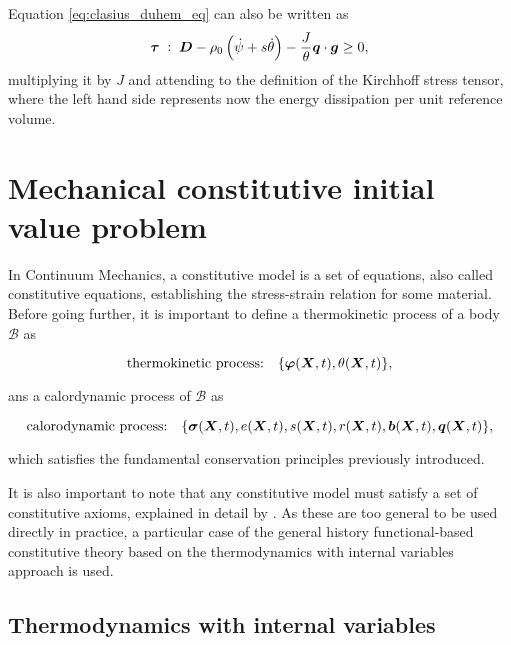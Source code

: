 Equation \eqref{eq:clasius_duhem_eq} can also be written as
\begin{equation}
    \bm{\tau}\;:\;\bm{D} -\rho_0\left(\dot\psi + s\dot \theta\right) -\frac{J}{\theta}\bm{q}\cdot \bm{g} \geq 0,
\end{equation}
multiplying it by $J$ and attending to the definition of the Kirchhoff stress tensor, where the left hand side represents now the energy dissipation per unit reference volume.


\section{Mechanical constitutive initial value problem}

In Continuum Mechanics, a constitutive model is a set of equations, also called constitutive equations, establishing the stress-strain relation for some material.
Before going further, it is important to define a thermokinetic process of a body $\mathscr{B}$ as
\begin{highlight}
    \begin{equation}
        \text{thermokinetic process:}\quad\{\bm{\varphi}(\bm{X}, t), \theta(\bm{X}, t)\},
    \end{equation}
\end{highlight}
ans a calordynamic process of $\mathscr{B}$ as
\begin{highlight}
    \begin{equation}
        \text{calorodynamic process:}\quad \{\bm{\sigma}(\bm{X}, t), e(\bm{X}, t), s(\bm{X}, t), r(\bm{X}, t), \bm{b}(\bm{X},t), \bm{q}(\bm{X}, t)\},
    \end{equation}
\end{highlight}
which satisfies the fundamental conservation principles previously introduced.

It is also important to note that any constitutive model must satisfy a set of constitutive axioms, explained  in detail by \cite{de2011computational}.
As these are too general to be used directly in practice, a particular case of the general history functional-based constitutive theory based on the thermodynamics with internal variables approach is used.

\subsection{Thermodynamics with internal variables}

